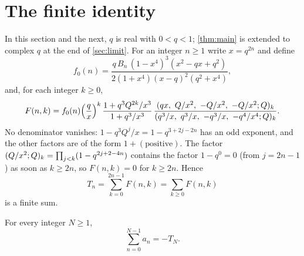 \section{The finite identity}\label{sec:finite}

In this section and the next, $q$ is real with $0<q<1$; \cref{thm:main} is
extended to complex $q$ at the end of \cref{sec:limit}. For an integer
$n\ge1$ write $x=q^{2n}$ and define
\begin{equation}\label{eq:f0}
f_0(n)=\frac{q\,B_n\,(1-x^4)^3(x^2-qx+q^2)}{2(1+x^4)(x-q)^2(q^2+x^4)},
\end{equation}
and, for each integer $k\ge0$,
\begin{equation}\label{eq:F}
F(n,k)=f_0(n)\Big(\frac qx\Big)^k\,\frac{1+q^3Q^{2k}/x^3}{1+q^3/x^3}\,
\frac{(qx,\ Q/x^2,\ -Q/x^2,\ -Q/x^2;Q)_{k}}
{(q^3/x,\ q^3/x,\ -q^3/x,\ -q^4/x^4;Q)_{k}} .
\end{equation}
No denominator vanishes: $1-q^3Q^j/x=1-q^{3+2j-2n}$ has an odd exponent, and
the other factors are of the form $1+(\text{positive})$. The factor
$(Q/x^2;Q)_{k}=\prod_{j<k}(1-q^{2j+2-4n})$ contains the factor
$1-q^{0}=0$ (from $j=2n-1$) as soon as $k\ge2n$, so $F(n,k)=0$ for $k\ge2n$.
Hence
\[
T_n=\sum_{k=0}^{2n-1}F(n,k)=\sum_{k\ge0}F(n,k)
\]
is a finite sum.

\begin{lemma}\label{lem:telescope}
For every integer $N\ge1$,
\begin{equation}\label{eq:telescope}
\sum_{n=0}^{N-1}a_n=-T_N .
\end{equation}
\end{lemma}

